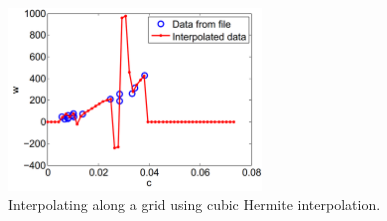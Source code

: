 \documentclass[11pt]{article}
\begin{document}
\begin{figure} [h]
\centering
\includegraphics[width=0.6\textwidth]{interpolator.PNG}
\caption{\label{fig:interpolator} Interpolating along a grid using
  cubic Hermite interpolation.}
\end{figure}


\end{document}

